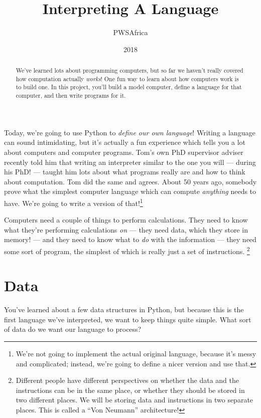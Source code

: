 \documentclass[12pt,draft]{article}
\author{PWSAfrica}
\date{2018}
\title{Interpreting A Language}
\begin{document}
\maketitle

\begin{abstract}
We've learned lots about programming computers, but so far we haven't really
covered how computation actually \emph{works}! One fun way to learn about how
computers work is to build one. In this project, you'll build a model computer,
define a language for that computer, and then write programs for it.
\end{abstract}

Today, we're going to use Python to \emph{define our own language}! Writing a
language can sound intimidating, but it's actually a fun experience which tells
you a lot about computers and computer programs. Tom's own PhD supervisor
adviser recently told him that writing an interpreter similar to the one you
will --- during his PhD! --- taught him lots about what programs really are and
how to think about computation. Tom did the same and agrees. About 50 years ago,
somebody prove what the simplest computer language which can compute
\emph{anything} needs to have. We're going to write a version of
that!\footnote{We're not going to implement the actual original language,
  because it's messy and complicated; instead, we're going to define a nicer
  version and use that.}\par

Computers need a couple of things to perform calculations. They need to know
what they're performing calculations \emph{on} --- they need data, which they
store in memory! --- and they need to know what to \emph{do} with the
information --- they need some sort of program, the simplest of which is really
just a set of instructions.
\footnote{Different people have different perspectives on whether the data and
  the instructions can be in the same place, or whether they should be stored in
  two different places. We will be storing data and instructions in two separate
  places. This is called a ``Von Neumann'' architecture!}\par

\section{Data}
You've learned about a few data structures in Python, but because this is the
first language we've interpreted, we want to keep things quite simple. What sort
of data do we want our language to process?
\end{document}
